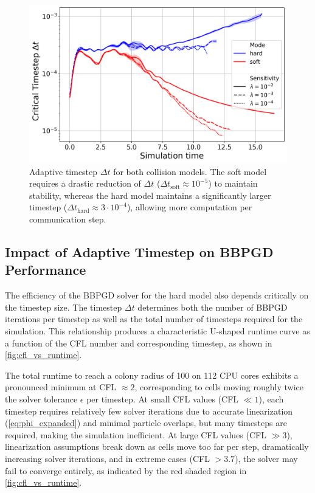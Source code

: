 \documentclass[conference]{IEEEtran}
\begin{document}
\begin{figure}[H]
    \centering
    \includegraphics[width=\linewidth]{figures/comparison_plots/combined_simulation_time_vs_dt.png}
    \caption{Adaptive timestep $\Delta t$ for both collision models. The soft model requires a drastic reduction of $\Delta t$ ($\Delta t_{\text{soft}} \approx 10^{-5}$) to maintain stability, whereas the hard model maintains a significantly larger timestep ($\Delta t_{\text{hard}} \approx 3 \cdot 10^{-4}$), allowing more computation per communication step.}
    \label{fig:simulation_time_vs_dt}
\end{figure}

\subsection{Impact of Adaptive Timestep on BBPGD Performance}
\label{sec:cfl_analysis}

The efficiency of the BBPGD solver for the hard model also depends critically on the timestep size. The timestep $\Delta t$ determines both the number of BBPGD iterations per timestep as well as the total number of timesteps required for the simulation. This relationship produces a characteristic U-shaped runtime curve as a function of the CFL number and corresponding timestep, as shown in \autoref{fig:cfl_vs_runtime}.

The total runtime to reach a colony radius of 100 on 112 CPU cores exhibits a pronounced minimum at CFL $\approx 2$, corresponding to cells moving roughly twice the solver tolerance $\epsilon$ per timestep. At small CFL values (CFL $\ll 1$), each timestep requires relatively few solver iterations due to accurate linearization (\autoref{eq:phi_expanded}) and minimal particle overlaps, but many timesteps are required, making the simulation inefficient. At large CFL values (CFL $\gg 3$), linearization assumptions break down as cells move too far per step, dramatically increasing solver iterations, and in extreme cases (CFL $> 3.7$), the solver may fail to converge entirely, as indicated by the red shaded region in \autoref{fig:cfl_vs_runtime}.
\end{document}
